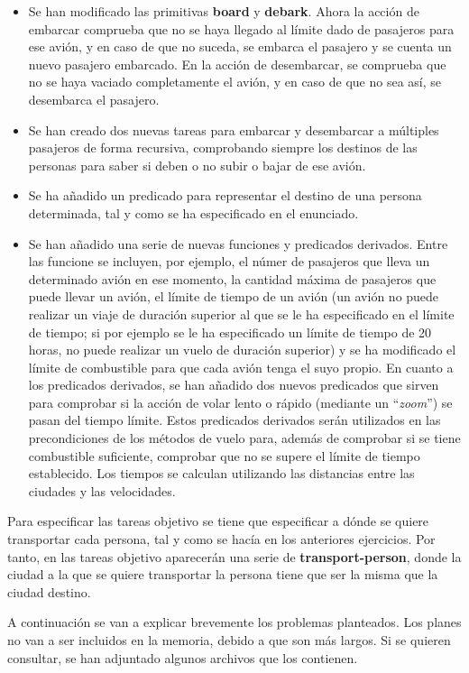 \documentclass[11pt,a4paper]{article}
\begin{document}
\begin{itemize}[label=\textbullet]
	\item Se han modificado las primitivas \textbf{board} y \textbf{debark}. Ahora la acción de embarcar comprueba que no se haya
	llegado al límite dado de pasajeros para ese avión, y en caso de que no suceda, se embarca el pasajero y se cuenta un nuevo
	pasajero embarcado. En la acción de desembarcar, se comprueba que no se haya vaciado completamente el avión, y en caso de que
	no sea así, se desembarca el pasajero.
	\item Se han creado dos nuevas tareas para embarcar y desembarcar a múltiples pasajeros de forma recursiva, comprobando siempre
	los destinos de las personas para saber si deben o no subir o bajar de ese avión.
	\item Se ha añadido un predicado para representar el destino de una persona determinada, tal y como se ha especificado en el
	enunciado.
	\item Se han añadido una serie de nuevas funciones y predicados derivados. Entre las funcione se incluyen, por ejemplo, el númer
	de pasajeros que lleva un determinado avión en ese momento, la cantidad máxima de pasajeros que puede llevar un avión, el límite
	de tiempo de un avión (un avión no puede realizar un viaje de duración superior al que se le ha especificado en el límite de
	tiempo; si por ejemplo se le ha especificado un límite de tiempo de 20 horas, no puede realizar un vuelo de duración superior)
	y se ha modificado el límite de combustible para que cada avión tenga el suyo propio. En cuanto a los predicados derivados, se han
	añadido dos nuevos predicados que sirven para comprobar si la acción de volar lento o rápido (mediante un ``\textit{zoom}'') se
	pasan del tiempo límite. Estos predicados derivados serán utilizados en las precondiciones de los métodos de vuelo para, además
	de comprobar si se tiene combustible suficiente, comprobar que no se supere el límite de tiempo establecido. Los tiempos se
	calculan utilizando las distancias entre las ciudades y las velocidades.
\end{itemize}

Para especificar las tareas objetivo se tiene que especificar a dónde se quiere transportar cada persona, tal y como se hacía en los
anteriores ejercicios. Por tanto, en las tareas objetivo aparecerán una serie de \textbf{transport-person}, donde la ciudad a la
que se quiere transportar la persona tiene que ser la misma que la ciudad destino.

A continuación se van a explicar brevemente los problemas planteados. Los planes no van a ser incluidos en la memoria, debido
a que son más largos. Si se quieren consultar, se han adjuntado algunos archivos que los contienen.
\end{document}
